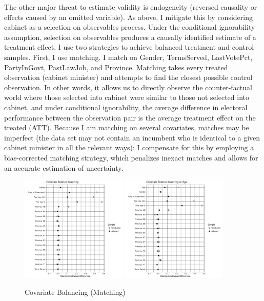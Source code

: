 \documentclass[letter,12pt]{article}
\begin{document}
The other major threat to estimate validity is endogeneity (reversed causality or effects caused by an omitted variable). As above, I mitigate this by considering cabinet as a selection on observables process. Under the conditional ignorability assumption, selection on observables produces a causally identified estimate of a treatment effect. I use two strategies to achieve balanced treatment and control samples. First, I use matching. I match on Gender, TermsServed, LastVotePct, PartyInGovt, PastLawJob, and Province. Matching takes every treated observation (cabinet minister) and attempts to find the closest possible control observation. In other words, it allows us to directly observe the counter-factual world where those selected into cabinet were similar to those not selected into cabinet, and under conditional ignorability, the average difference in electoral performance between the observation pair is the average treatment effect on the treated (ATT). Because I am matching on several covariates, matches may be imperfect (the data set may not contain an incumbent who is identical to a given cabinet minister in all the relevant ways): I compensate for this by employing a bias-corrected matching strategy, which penalizes inexact matches and allows for an accurate estimation of uncertainty.

\begin{figure}
\centering
\caption{Covariate Balancing (Matching)}
\includegraphics[width=0.45\textwidth]{"Includes/love_plot_match"}
\includegraphics[width=0.45\textwidth]{"Includes/love_plot_match_age"}
\end{figure}
\end{document}
